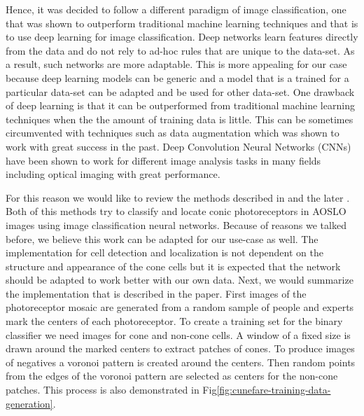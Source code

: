 \documentclass[]{article}
\begin{document}
Hence, it was decided to follow a different paradigm of image classification, one that was shown to outperform traditional machine learning techniques and that is to use deep learning for image classification.
Deep networks learn features directly from the data and do not rely to ad-hoc rules
that are unique to the data-set.
As a result, such networks are more adaptable.
This is more appealing for our case because deep learning models can be
generic and a model that is a trained for a particular data-set can be
adapted and be used for other data-set.
One drawback of deep learning is that it can be outperformed from traditional machine learning techniques when the the amount of training data is little.
This can be sometimes circumvented with techniques such as data augmentation\cite{perez_effectiveness_2017} which was shown to work with great success in the past\cite{ronneberger_u-net_2015}.
Deep Convolution Neural Networks (CNNs)  have been shown to work for different image analysis tasks in many fields including optical imaging\cite{gulshan_development_2016, perez_effectiveness_2017, li_cross-modality_2016, fu_retinal_2016, fang} with great performance.


For this reason we would like to review the methods described in \cite{cunefare_open_2017} and the later \cite{cunefare_deep_2018}.
Both of this methods try to classify and locate conic photoreceptors in
AOSLO images using image classification neural networks.
Because of reasons we talked before, we believe this work can be adapted for our use-case as well.
The implementation for cell detection and localization is not dependent on the structure and appearance of the cone cells but it is expected that the network should be adapted to work better with our own data.
Next, we would summarize the implementation that is described in the paper.
First images of the photoreceptor mosaic are generated from a random sample of people and experts mark the centers of each photoreceptor.
To create a training set for the binary classifier we need images for cone and non-cone cells.
A window of a fixed size is drawn around the marked centers to extract patches of cones.
To produce images of negatives a voronoi pattern is created around the centers.
Then random points from the edges of the voronoi pattern are selected as centers for the 
non-cone patches.
This process is also demonstrated in Fig\ref{fig:cunefare-training-data-generation}.
\end{document}
